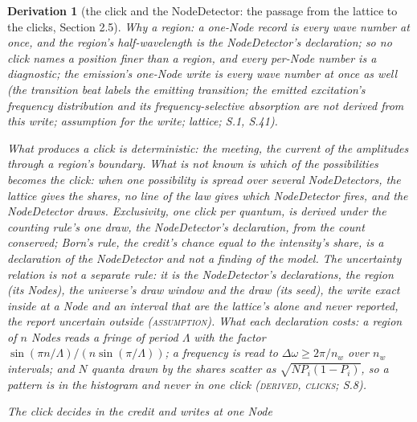 \documentclass[pdflatex,sn-mathphys-num]{sn-jnl}
\newcommand{\claimmark}[1]{\textup{\textsc{#1}}}
\newcommand{\fence}[1]{\textup{\textsc{#1}}}
\theoremstyle{thmstyleone}
\newtheorem{derivation}{Derivation}
\begin{document}
\begin{derivation}[the click and the NodeDetector: the passage from the lattice to the clicks, Section 2.5]
Why a region: a one-Node record is every wave number at once, and the region's half-wavelength is the NodeDetector's declaration; so no click names a position finer than a region, and every per-Node number is a diagnostic; the emission's one-Node write is every wave number at once as well (the transition beat labels the emitting transition; the emitted excitation's frequency distribution and its frequency-selective absorption are not derived from this write; assumption for the write; lattice; S.1, S.41).

What produces a click is deterministic: the meeting, the current of the amplitudes through a region's boundary. What is not known is which of the possibilities becomes the click: when one possibility is spread over several NodeDetectors, the lattice gives the shares, no line of the law gives which NodeDetector fires, and the NodeDetector draws. Exclusivity, one click per quantum, is derived under the counting rule's one draw, the NodeDetector's declaration, from the count conserved; Born's rule, the credit's chance equal to the intensity's share, is a declaration of the NodeDetector and not a finding of the model. The uncertainty relation is not a separate rule: it is the NodeDetector's declarations, the region (its Nodes), the universe's draw window and the draw (its seed), the write exact inside at a Node and an interval that are the lattice's alone and never reported, the report uncertain outside (\claimmark{assumption}). What each declaration costs: a region of $n$ Nodes reads a fringe of period $\Lambda$ with the factor $\sin(\pi n / \Lambda) / (n\sin(\pi / \Lambda))$; a frequency is read to $\Delta\omega \ge 2\pi / n_w$ over $n_w$ intervals; and $N$ quanta drawn by the shares scatter as $\sqrt{NP_i(1 - P_i)}$, so a pattern is in the histogram and never in one click (\claimmark{derived}, \fence{clicks}; S.8).

\emph{The click decides in the credit and writes at one Node}


\end{derivation}
\end{document}
